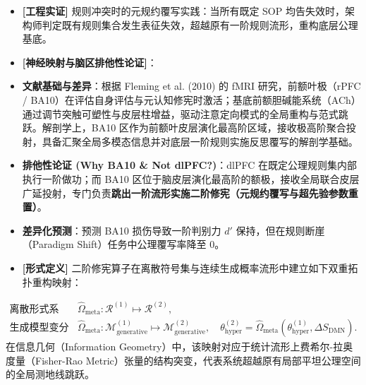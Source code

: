 \documentclass[11pt,a4paper,oneside]{ctexart}
\begin{document}
\begin{itemize}\item \textbf{[工程实证]} 规则冲突时的元规约覆写实践：当所有既定 SOP 均告失效时，架构师判定既有规则集合发生表征失效，超越原有一阶规则流形，重构底层公理基底。\end{itemize}
\begin{itemize}\item \textbf{[神经映射与脑区排他性论证]}：\end{itemize}
\begin{itemize}\item \textbf{文献基础与差异}：根据 Fleming et al. (2010) 的 fMRI 研究，前额叶极（rPFC / BA10）在评估自身评估与元认知修宪时激活；基底前额胆碱能系统（ACh）通过调节突触可塑性与皮层柱增益，驱动注意定向模式的全局重构与范式跳跃。解剖学上，BA10 区作为前额叶皮层演化最高阶区域，接收极高阶聚合投射，具备汇聚全局多模态信息并对底层一阶规则实施反思覆写的解剖学基础。\end{itemize}
\begin{itemize}\item \textbf{排他性论证 (Why BA10 \& Not dlPFC?)}：dlPFC 在既定公理规则集内部执行一阶做功；而 BA10 区位于脑皮层演化最高阶的额极，接收全局联合皮层广延投射，专门负责\textbf{跳出一阶流形实施二阶修宪（元规约覆写与超先验参数重置）}。\end{itemize}
\begin{itemize}\item \textbf{差异化预测}：预测 BA10 损伤导致一阶判别力 $d'$ 保持，但在规则断崖（Paradigm Shift）任务中公理覆写率降至 0。\end{itemize}
\begin{itemize}\item \textbf{[形式定义]} 二阶修宪算子在离散符号集与连续生成概率流形中建立如下双重拓扑重构映射：\end{itemize}
\begin{equation}
\begin{aligned}
\text{离散形式系统：} \quad & \hat{\Omega}_{\text{meta}}: \mathcal{R}^{(1)} \mapsto \mathcal{R}^{(2)}, \\
\text{生成模型变分流形：} \quad & \hat{\Omega}_{\text{meta}}: \mathcal{M}_{\text{generative}}^{(1)} \mapsto \mathcal{M}_{\text{generative}}^{(2)}, \quad \theta_{\text{hyper}}^{(2)} = \hat{\Omega}_{\text{meta}}\left(\theta_{\text{hyper}}^{(1)}, \Delta S_{\text{DMN}}\right).
\end{aligned}
\end{equation}
在信息几何（Information Geometry）中，该映射对应于统计流形上费希尔-拉奥度量（Fisher-Rao Metric）张量的结构突变，代表系统超越原有局部平坦公理空间的全局测地线跳跃。
\end{document}
